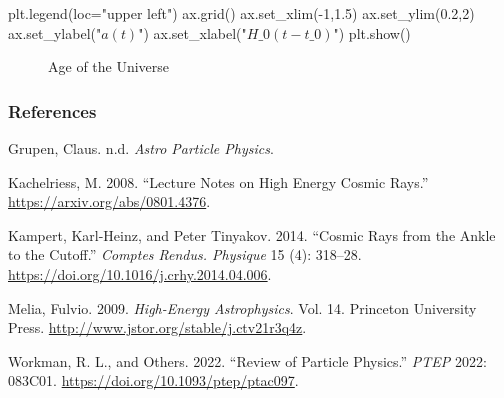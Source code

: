 \documentclass[
  letterpaper,
  DIV=11,
  numbers=noendperiod]{scrreprt}
\newenvironment{Shaded}{\begin{snugshade}}{\end{snugshade}}
\newcommand{\DecValTok}[1]{\textcolor[rgb]{0.68,0.00,0.00}{#1}}
\newcommand{\FloatTok}[1]{\textcolor[rgb]{0.68,0.00,0.00}{#1}}
\newcommand{\NormalTok}[1]{\textcolor[rgb]{0.00,0.23,0.31}{#1}}
\newcommand{\OperatorTok}[1]{\textcolor[rgb]{0.37,0.37,0.37}{#1}}
\newcommand{\StringTok}[1]{\textcolor[rgb]{0.13,0.47,0.30}{#1}}
\newlength{\cslhangindent}
\newenvironment{CSLReferences}[2] %
 {\begin{list}{}{%
  \setlength{\itemindent}{0pt}
  \setlength{\leftmargin}{0pt}
  \setlength{\parsep}{0pt}
  \ifodd #1
   \setlength{\leftmargin}{\cslhangindent}
   \setlength{\itemindent}{-1\cslhangindent}
  \fi
  \setlength{\itemsep}{#2\baselineskip}}}
 {\end{list}}
\begin{document}
\begin{tcolorbox}[enhanced jigsaw, toprule=.15mm, colframe=quarto-callout-color-frame, bottomrule=.15mm, leftrule=.75mm, left=2mm, breakable, rightrule=.15mm, arc=.35mm, opacityback=0, colback=white]
\begin{Shaded}
\begin{Highlighting}[]
\NormalTok{plt.legend(loc}\OperatorTok{=}\StringTok{"upper left"}\NormalTok{)}
\NormalTok{ax.grid()}
\NormalTok{ax.set\_xlim(}\OperatorTok{{-}}\DecValTok{1}\NormalTok{,}\FloatTok{1.5}\NormalTok{)}
\NormalTok{ax.set\_ylim(}\FloatTok{0.2}\NormalTok{,}\DecValTok{2}\NormalTok{)}
\NormalTok{ax.set\_ylabel(}\StringTok{"$a(t)$"}\NormalTok{)}
\NormalTok{ax.set\_xlabel(}\StringTok{"$H\_0 (t {-} t\_0)$"}\NormalTok{)}
\NormalTok{plt.show()}
\end{Highlighting}
\end{Shaded}

\begin{figure}[H]


\caption{\label{fig-age}Age of the Universe}

\end{figure}%

\end{tcolorbox}

\subsubsection*{References}\label{references}

\label{refs}
\begin{CSLReferences}{1}{0}
Grupen, Claus. n.d. \emph{Astro Particle Physics}.

Kachelriess, M. 2008. {``Lecture Notes on High Energy Cosmic Rays.''}
\url{https://arxiv.org/abs/0801.4376}.

Kampert, Karl-Heinz, and Peter Tinyakov. 2014. {``Cosmic Rays from the
Ankle to the Cutoff.''} \emph{Comptes Rendus. Physique} 15 (4): 318--28.
\url{https://doi.org/10.1016/j.crhy.2014.04.006}.

Melia, Fulvio. 2009. \emph{High-Energy Astrophysics}. Vol. 14. Princeton
University Press. \url{http://www.jstor.org/stable/j.ctv21r3q4z}.

Workman, R. L., and Others. 2022. {``{Review of Particle Physics}.''}
\emph{PTEP} 2022: 083C01. \url{https://doi.org/10.1093/ptep/ptac097}.

\end{CSLReferences}
\end{document}
